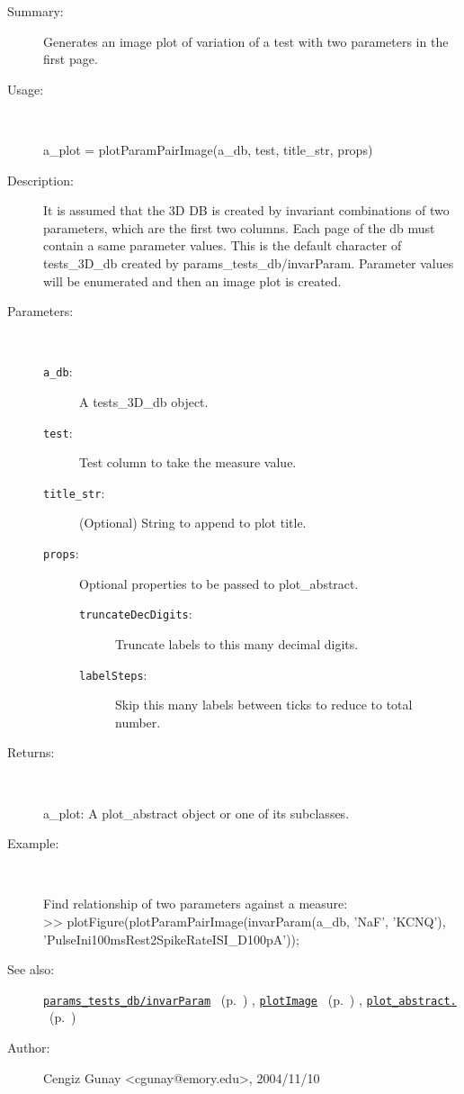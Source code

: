 \begin{description}
\item[Summary:]Generates an image plot of variation of a test with two parameters in the first page.
%
\item[Usage:]~%
\begin{lyxcode}%
a\_plot = plotParamPairImage(a\_db, test, title\_str, props)
%
\end{lyxcode}%
%
\item[Description:]%
It is assumed that the 3D DB is created by invariant combinations of two parameters,
 which are the first two columns. Each page of the db must contain a same parameter 
 values. This is the default character of tests\_3D\_db created by 
 params\_tests\_db/invarParam. Parameter values will be enumerated and then an 
 image plot is created.
\item[Parameters:]~
\begin{description}%
\item[\texttt{a\_db}:]
 A tests\_3D\_db object.
\item[\texttt{test}:]
 Test column to take the measure value.
\item[\texttt{title\_str}:]
 (Optional) String to append to plot title.
\item[\texttt{props}:]
 Optional properties to be passed to plot\_abstract.
\begin{description}%
\item[\texttt{truncateDecDigits}:]
 Truncate labels to this many decimal digits.
\item[\texttt{labelSteps}:]
 Skip this many labels between ticks to reduce to total number.
\end{description}%
\end{description}%
%
\item[Returns:]~

	a\_plot: A plot\_abstract object or one of its subclasses.
%
\item[Example:]~
\begin{lyxcode} Find relationship of two parameters against a measure:\\%
 >> plotFigure(plotParamPairImage(invarParam(a\_db, {'NaF', 'KCNQ'}), 'PulseIni100msRest2SpikeRateISI\_D100pA'));\\%
\end{lyxcode}
%
\item[See also:]%
\hyperlink{ref_params_tests_db__invarParam}{\texttt{params\_tests\_db/invarParam}}%
\ (p.~\pageref{ref_params_tests_db__invarParam})%
%
, \hyperlink{ref_plotImage}{\texttt{plotImage}}%
\ (p.~\pageref{ref_plotImage})%
%
, \hyperlink{ref_plot_abstract.}{\texttt{plot\_abstract.}}%
\ (p.~\pageref{ref_plot_abstract.})%
%
%
\item[Author:]%
Cengiz Gunay <cgunay@emory.edu>, 2004/11/10%
\end{description}
\methodline%
